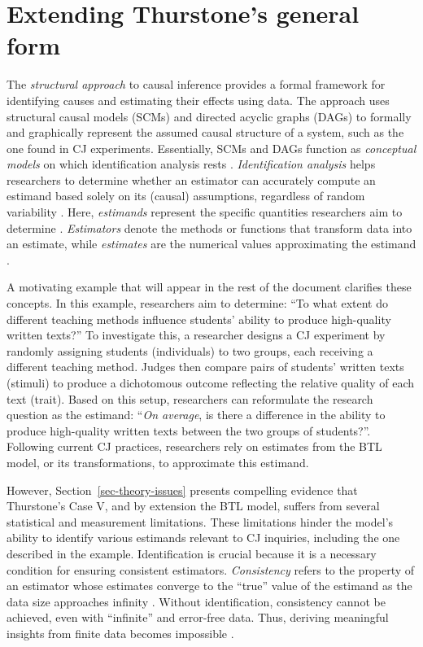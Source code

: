 \documentclass[
  authoryear,
  review,
  1p]{elsarticle}
\begin{document}
\section{Extending Thurstone's general form}\label{sec-theoretical}

The \emph{structural approach} to causal inference provides a formal
framework for identifying causes and estimating their effects using
data. The approach uses structural causal models (SCMs) and directed
acyclic graphs (DAGs)
\citep{Pearl_2009, Pearl_et_al_2016, Gross_et_al_2018, Neal_2020} to
formally and graphically represent the assumed causal structure of a
system, such as the one found in CJ experiments. Essentially, SCMs and
DAGs function as \emph{conceptual models} on which identification
analysis rests \citep[pp.~4]{Schuessler_et_al_2023}.
\emph{Identification analysis} helps researchers to determine whether an
estimator can accurately compute an estimand based solely on its
(causal) assumptions, regardless of random variability
\citep[pp.~4]{Schuessler_et_al_2023}. Here, \emph{estimands} represent
the specific quantities researchers aim to determine
\citep{Everitt_et_al_2010}. \emph{Estimators} denote the methods or
functions that transform data into an estimate, while \emph{estimates}
are the numerical values approximating the estimand
\citep{Neal_2020, Everitt_et_al_2010}.

A motivating example that will appear in the rest of the document
clarifies these concepts. In this example, researchers aim to determine:
``To what extent do different teaching methods influence students'
ability to produce high-quality written texts?'' To investigate this, a
researcher designs a CJ experiment by randomly assigning students
(individuals) to two groups, each receiving a different teaching method.
Judges then compare pairs of students' written texts (stimuli) to
produce a dichotomous outcome reflecting the relative quality of each
text (trait). Based on this setup, researchers can reformulate the
research question as the estimand: ``\emph{On average}, is there a
difference in the ability to produce high-quality written texts between
the two groups of students?''. Following current CJ practices,
researchers rely on estimates from the BTL model, or its
transformations, to approximate this estimand.

However, Section~\ref{sec-theory-issues} presents compelling evidence
that Thurstone's Case V, and by extension the BTL model, suffers from
several statistical and measurement limitations. These limitations
hinder the model's ability to identify various estimands relevant to CJ
inquiries, including the one described in the example. Identification is
crucial because it is a necessary condition for ensuring consistent
estimators. \emph{Consistency} refers to the property of an estimator
whose estimates converge to the ``true'' value of the estimand as the
data size approaches infinity \citep{Everitt_et_al_2010}. Without
identification, consistency cannot be achieved, even with ``infinite''
and error-free data. Thus, deriving meaningful insights from finite data
becomes impossible \citep[pp.~5]{Schuessler_et_al_2023}.
\end{document}

